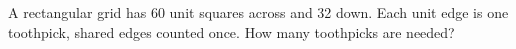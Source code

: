 A rectangular grid has 60 unit squares across and 32 down. Each unit edge is one toothpick, shared edges counted once. How many toothpicks are needed?
